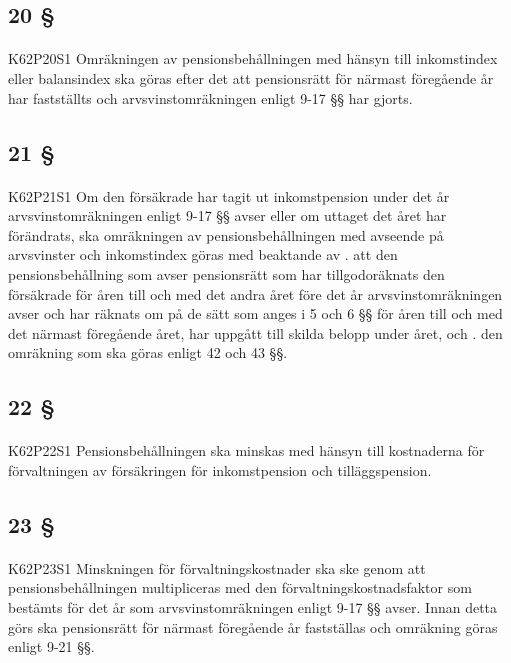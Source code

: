 \documentclass[a4paper,notitlepage,openany,10pt]{book}
\begin{document}
\subsection*{20 §}
\paragraph*{}
{\tiny K62P20S1}
Omräkningen av pensionsbehållningen med hänsyn till inkomstindex eller balansindex ska göras efter det att pensionsrätt för närmast föregående år har fastställts och arvsvinstomräkningen enligt 9-17 §§ har gjorts.
\subsection*{21 §}
\paragraph*{}
{\tiny K62P21S1}
Om den försäkrade har tagit ut inkomstpension under det år arvsvinstomräkningen enligt 9-17 §§ avser eller om uttaget det året har förändrats, ska omräkningen av pensionsbehållningen med avseende på arvsvinster och inkomstindex göras med beaktande av
. att den pensionsbehållning som avser pensionsrätt som har tillgodoräknats den försäkrade för åren till och med det andra året före det år arvsvinstomräkningen avser och har räknats om på de sätt som anges i 5 och 6 §§ för åren till och med det närmast föregående året, har uppgått till skilda belopp under året, och
. den omräkning som ska göras enligt 42 och 43 §§.
\subsection*{22 §}
\paragraph*{}
{\tiny K62P22S1}
Pensionsbehållningen ska minskas med hänsyn till kostnaderna för förvaltningen av försäkringen för inkomstpension och tilläggspension.
\subsection*{23 §}
\paragraph*{}
{\tiny K62P23S1}
Minskningen för förvaltningskostnader ska ske genom att pensionsbehållningen multipliceras med den förvaltningskostnadsfaktor som bestämts för det år som arvsvinstomräkningen enligt 9-17 §§ avser. Innan detta görs ska pensionsrätt för närmast föregående år fastställas och omräkning göras enligt 9-21 §§.
\end{document}

